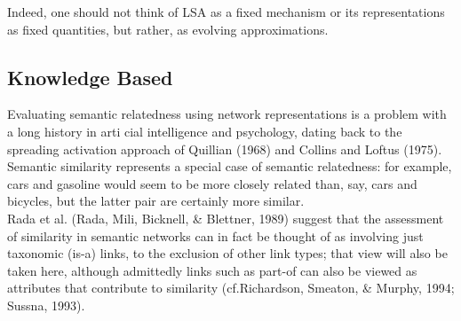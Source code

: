 Indeed, one should not think of LSA as a fixed mechanism or its representations as
fixed quantities, but rather, as evolving approximations.

\subsection{Knowledge Based}
Evaluating semantic relatedness using network representations is a problem with a long history in arti cial intelligence and psychology, dating back to the spreading activation approach of Quillian (1968) and Collins and Loftus (1975). Semantic similarity represents a special case of semantic relatedness: for example, cars and gasoline would seem to be more closely related than, say, cars and bicycles, but the latter pair are certainly more similar.\\
Rada et al. (Rada, Mili, Bicknell, & Blettner, 1989) suggest that the assessment of similarity in semantic networks can in fact be thought of as involving just taxonomic (is-a) links, to the exclusion of other link types; that view will also be taken here, although admittedly links such as part-of can also be viewed as attributes that contribute to similarity (cf.Richardson, Smeaton, & Murphy, 1994; Sussna, 1993).\\

